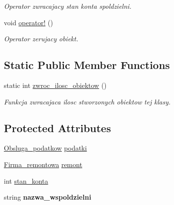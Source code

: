\begin{DoxyCompactItemize}
\begin{DoxyCompactList}\small\item\em Operator zwracajacy stan konta spoldzielni. \end{DoxyCompactList}\item 
\hypertarget{class_zarzadanie__wspoldzielnia_a6ba5f8752ec31e14ae97a84db5abc103}{}void \hyperlink{class_zarzadanie__wspoldzielnia_a6ba5f8752ec31e14ae97a84db5abc103}{operator!} ()\label{class_zarzadanie__wspoldzielnia_a6ba5f8752ec31e14ae97a84db5abc103}

\begin{DoxyCompactList}\small\item\em Operator zerujacy obiekt. \end{DoxyCompactList}\end{DoxyCompactItemize}
\subsection*{Static Public Member Functions}
\begin{DoxyCompactItemize}
\item 
\hypertarget{class_zarzadanie__wspoldzielnia_adbe9f19e8c8df7718ab41f1e50efa646}{}static int \hyperlink{class_zarzadanie__wspoldzielnia_adbe9f19e8c8df7718ab41f1e50efa646}{zwroc\+\_\+ilosc\+\_\+obiektow} ()\label{class_zarzadanie__wspoldzielnia_adbe9f19e8c8df7718ab41f1e50efa646}

\begin{DoxyCompactList}\small\item\em Funkcja zwracajaca ilosc stworzonych obiektow tej klasy. \end{DoxyCompactList}\end{DoxyCompactItemize}
\subsection*{Protected Attributes}
\begin{DoxyCompactItemize}
\item 
\hyperlink{class_obsluga__podatkow}{Obsluga\+\_\+podatkow} \hyperlink{class_zarzadanie__wspoldzielnia_af5e229cd0bab0209b7632c0253056a0d}{podatki}
\item 
\hyperlink{class_firma__remontowa}{Firma\+\_\+remontowa} \hyperlink{class_zarzadanie__wspoldzielnia_a7fea60db6edb39ddc071ad3fda0e51ae}{remont}
\item 
int \hyperlink{class_zarzadanie__wspoldzielnia_ace2917345d07ecbb67d67b5bbe066192}{stan\+\_\+konta}
\item 
\hypertarget{class_zarzadanie__wspoldzielnia_a468ef58306e2834fa96cdaec7dda2573}{}string {\bfseries nazwa\+\_\+wspoldzielni}\label{class_zarzadanie__wspoldzielnia_a468ef58306e2834fa96cdaec7dda2573}

\end{DoxyCompactItemize}
